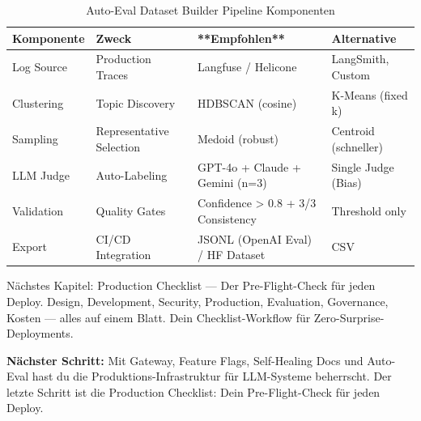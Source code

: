 \begin{table}[H]
\centering
\begin{tabularx}{\linewidth}{lXXX}
\toprule
\textbf{Komponente} & \textbf{Zweck} & **Empfohlen** & \textbf{Alternative} \\
\midrule
Log Source & Production Traces & Langfuse / Helicone & LangSmith, Custom \\
Clustering & Topic Discovery & HDBSCAN (cosine) & K-Means (fixed k) \\
Sampling & Representative Selection & Medoid (robust) & Centroid (schneller) \\
LLM Judge & Auto-Labeling & GPT-4o + Claude + Gemini (n=3) & Single Judge (Bias) \\
Validation & Quality Gates & Confidence > 0.8 + 3/3 Consistency & Threshold only \\
Export & CI/CD Integration & JSONL (OpenAI Eval) / HF Dataset & CSV \\
\bottomrule
\end{tabularx}
\caption{Auto-Eval Dataset Builder Pipeline Komponenten}
\label{tab:ch17_autoeval_components}
\end{table}


\par
\begin{autornotizEnv}
Nächstes Kapitel: Production Checklist — Der Pre-Flight-Check für jeden Deploy. Design, Development, Security, Production, Evaluation, Governance, Kosten — alles auf einem Blatt. Dein Checklist-Workflow für Zero-Surprise-Deployments.
\end{autornotizEnv}

\textbf{Nächster Schritt:} Mit Gateway, Feature Flags, Self-Healing Docs und Auto-Eval hast du die Produktions-Infrastruktur für LLM-Systeme beherrscht. Der letzte Schritt ist die Production Checklist: Dein Pre-Flight-Check für jeden Deploy.

\endinput